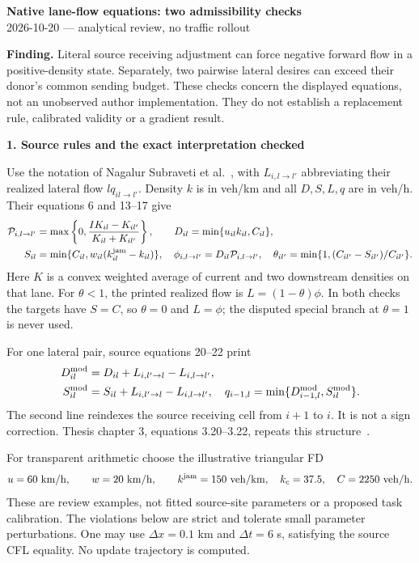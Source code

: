 \documentclass[10pt,a4paper]{article}
\newcommand{\head}[1]{\par\medskip\textbf{#1}\par}
\newcommand{\Prule}{\mathcal P}
\begin{document}
\begin{center}
{\large\bfseries Native lane-flow equations: two admissibility checks}\\[3pt]
2026-10-20 --- analytical review, no traffic rollout
\end{center}

\textbf{Finding.} Literal source receiving adjustment can force negative
forward flow in a positive-density state. Separately, two pairwise lateral
desires can exceed their donor's common sending budget. These checks concern
the displayed equations, not an unobserved author implementation. They do
not establish a replacement rule, calibrated validity or a gradient result.

\head{1. Source rules and the exact interpretation checked}
Use the notation of Nagalur Subraveti et al.~\cite{ns}, with $L_{i,l\to l'}$
abbreviating their realized lateral flow $lq_{il\to l'}$. Density $k$ is in
veh/km and all $D,S,L,q$ are in veh/h. Their equations 6 and 13--17 give
\begin{align}
 \Prule_{i,l\to l'}&=\max\left\{0,
       \frac{I K_{il}-K_{il'}}{K_{il}+K_{il'}}\right\},\qquad
 D_{il}=\min\{u_{il}k_{il},C_{il}\}, \label{eq:desire}\\
 S_{il}&=\min\{C_{il},w_{il}(k^{\rm jam}_{il}-k_{il})\},\quad
 \phi_{i,l\to l'}=D_{il}\Prule_{i,l\to l'},\quad
 \theta_{il'}=\min\{1,(C_{il'}-S_{il'})/C_{il'}\}. \label{eq:receiving}
\end{align}
Here $K$ is a convex weighted average of current and two downstream densities
on that lane. For $\theta<1$, the printed realized flow is
$L=(1-\theta)\phi$. In both checks the targets have $S=C$, so $\theta=0$
and $L=\phi$; the disputed special branch at $\theta=1$ is never used.

For one lateral pair, source equations 20--22 print
\begin{align}
 D^{\rm mod}_{il}&=D_{il}+L_{i,l'\to l}-L_{i,l\to l'},\nonumber\\
 S^{\rm mod}_{il}&=S_{il}+L_{i,l'\to l}-L_{i,l\to l'},\quad
 q_{i-1,l}=\min\{D^{\rm mod}_{i-1,l},S^{\rm mod}_{il}\}. \label{eq:adjusted}
\end{align}
The second line reindexes the source receiving cell from $i+1$ to $i$.
It is not a sign correction. Thesis chapter 3, equations 3.20--3.22,
repeats this structure~\cite{thesis}.

For transparent arithmetic choose the illustrative triangular FD
\begin{equation}
 u=60\ {\rm km/h},\qquad w=20\ {\rm km/h},\qquad
 k^{\rm jam}=150\ {\rm veh/km},\quad k_c=37.5,\quad C=2250\ {\rm veh/h}.
 \label{eq:parameters}
\end{equation}
These are review examples, not fitted source-site parameters or a proposed
task calibration. The violations below are strict and tolerate small
parameter perturbations. One may use $\Delta x=0.1$ km and $\Delta t=6$ s,
satisfying the source CFL equality. No update trajectory is computed.
\end{document}
